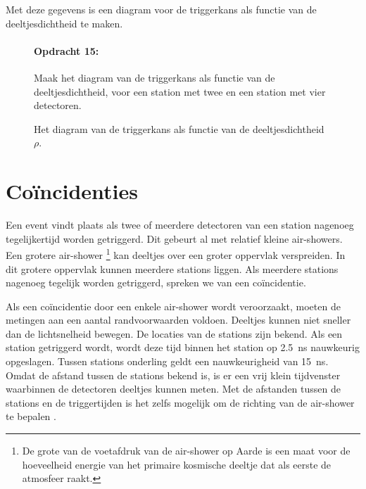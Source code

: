 \bigskip{}


Met deze gegevens is een diagram voor de triggerkans als functie van
de deeltjesdichtheid te maken.

\begin{figure}[h]
    \paragraph{Opdracht 15:}
    	Maak het diagram van de triggerkans als functie van de
         deeltjesdichtheid, voor een station met twee en een station
         met vier detectoren.

    \bigskip{}
    \bigskip{}

    \caption{Het diagram van de triggerkans als functie van de deeltjesdichtheid $\rho$.}
\end{figure}


\section{Coïncidenties}

Een event vindt plaats als twee of meerdere detectoren van een station
nagenoeg tegelijkertijd worden getriggerd. Dit gebeurt al met relatief
kleine air-showers. Een grotere air-shower%
\footnote{De grote van de voetafdruk van de air-shower op Aarde is een maat
voor de hoeveelheid energie van het primaire kosmische deeltje dat
als eerste de atmosfeer raakt.%
} kan deeltjes over een groter oppervlak verspreiden. In dit grotere
oppervlak kunnen meerdere stations liggen. Als meerdere stations nagenoeg
tegelijk worden getriggerd, spreken we van een coïncidentie.

Als een coïncidentie door een enkele air-shower wordt veroorzaakt,
moeten de metingen aan een aantal randvoorwaarden voldoen. Deeltjes
kunnen niet sneller dan de lichtsnelheid bewegen. De locaties van
de stations zijn bekend. Als een station getriggerd wordt, wordt deze
tijd binnen het station op \SI{2.5}{\nano\second} nauwkeurig opgeslagen.
Tussen stations onderling geldt een nauwkeurigheid van \SI{15}{\nano\second}.
Omdat de afstand tussen de stations bekend is, is er een vrij klein
tijdvenster waarbinnen de detectoren deeltjes kunnen meten. Met de
afstanden tussen de stations en de triggertijden is het zelfs mogelijk
om de richting van de air-shower te bepalen \cite{veen2013richting}.

